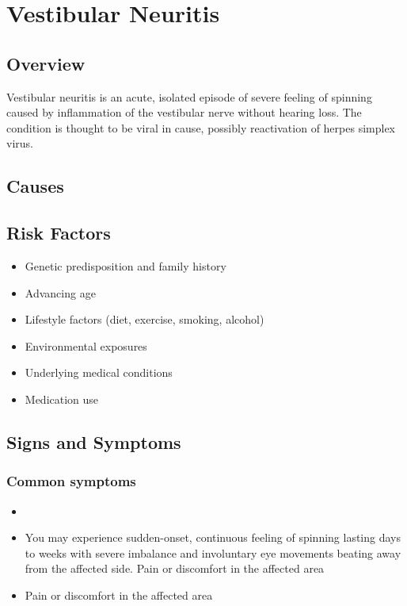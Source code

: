 \chapter{Vestibular Neuritis}
\label{sec:Vestibular Neuritis}

\section{Overview}
Vestibular neuritis is an acute, isolated episode of severe feeling of spinning caused by inflammation of the vestibular nerve without hearing loss. The condition is thought to be viral in cause, possibly reactivation of herpes simplex virus.
\section{Causes}
\section{Risk Factors}

\begin{itemize}[noitemsep]
  \item Genetic predisposition and family history
  \item Advancing age
  \item Lifestyle factors (diet, exercise, smoking, alcohol)
  \item Environmental exposures
  \item Underlying medical conditions
  \item Medication use
\end{itemize}
\section{Signs and Symptoms}

\subsection{Common symptoms}
\begin{itemize}[noitemsep]
  \item \item You may experience sudden-onset, continuous feeling of spinning lasting days to weeks with severe imbalance and involuntary eye movements beating away from the affected side. Pain or discomfort in the affected area    \item Pain or discomfort in the affected area
  \end{itemize}

